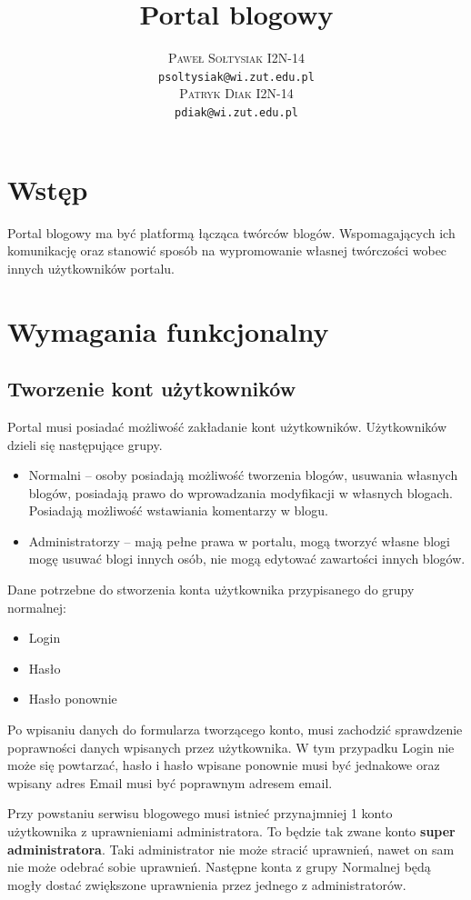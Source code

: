 \documentclass{article}
\title{Portal blogowy}
\author{\textsc{Paweł Sołtysiak I2N-14} \\ \texttt{psoltysiak@wi.zut.edu.pl} \\
\textsc{Patryk Diak I2N-14} \\ \texttt{pdiak@wi.zut.edu.pl} \\}
\begin{document}
\maketitle
\tableofcontents
\section{Wstęp}
Portal blogowy ma być platformą łącząca twórców blogów. Wspomagających ich komunikację oraz stanowić sposób na wypromowanie własnej twórczości wobec innych użytkowników portalu.



\section{Wymagania funkcjonalny}
\subsection{Tworzenie kont użytkowników}
Portal musi posiadać możliwość zakładanie kont użytkowników. Użytkowników dzieli się następujące grupy.
\begin{itemize}
\item Normalni -- osoby posiadają możliwość tworzenia blogów, usuwania własnych blogów, posiadają prawo do wprowadzania modyfikacji w własnych blogach. Posiadają możliwość wstawiania komentarzy w blogu.
\item Administratorzy -- mają pełne prawa w portalu, mogą tworzyć własne blogi mogę usuwać blogi innych osób, nie mogą edytować zawartości innych blogów.
\end{itemize}

Dane potrzebne do stworzenia konta użytkownika przypisanego do grupy normalnej:
\begin{itemize}
\item Login
\item Hasło
\item Hasło ponownie
\end{itemize}

Po wpisaniu danych do formularza tworzącego konto, musi zachodzić sprawdzenie poprawności danych wpisanych przez użytkownika. W tym przypadku Login nie może się powtarzać, hasło i hasło wpisane ponownie musi być jednakowe oraz wpisany adres Email musi być poprawnym adresem email.

Przy powstaniu serwisu blogowego musi istnieć przynajmniej 1 konto użytkownika z uprawnieniami administratora. To będzie tak zwane konto \textbf{super administratora}. Taki administrator nie może stracić uprawnień, nawet on sam nie może odebrać sobie uprawnień. Następne konta z grupy Normalnej będą mogły dostać zwiększone uprawnienia przez jednego z administratorów.
\end{document}
